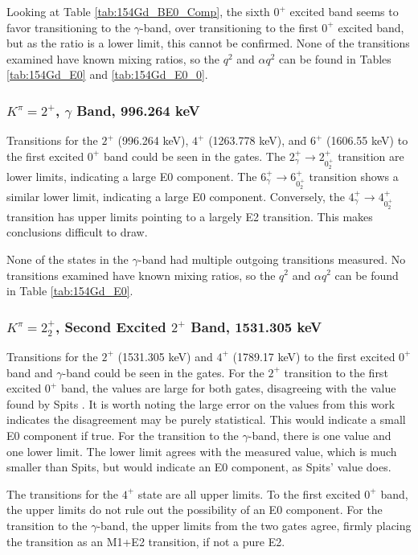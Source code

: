 Looking at Table \ref{tab:154Gd_BE0_Comp}, the sixth $0^+$ excited band seems to favor transitioning to the $\gamma$-band, over transitioning to the first $0^+$ excited band, but as the ratio is a lower limit, this cannot be confirmed. None of the transitions examined have known mixing ratios, so the $q^2$ and $\alpha q^2$ can be found in Tables \ref{tab:154Gd_E0} and \ref{tab:154Gd_E0_0}. 

\subsubsection{$K^{\pi}=2^+$, $\gamma$ Band, 996.264 keV}

Transitions for the $2^+$ (996.264 keV), $4^+$ (1263.778 keV), and $6^+$ (1606.55 keV) to the first excited $0^+$ band could be seen in the gates. The $2^+_{\gamma}\rightarrow 2^+_{0^+_2}$ transition are lower limits, indicating a large E0 component. The $6^+_{\gamma}\rightarrow 6^+_{0^+_2}$ transition shows a similar lower limit, indicating a large E0 component. Conversely, the $4^+_{\gamma}\rightarrow 4^+_{0^+_2}$ transition has upper limits pointing to a largely E2 transition. This makes conclusions difficult to draw.

None of the states in the $\gamma$-band had multiple outgoing transitions measured.  No transitions examined have known mixing ratios, so the $q^2$ and $\alpha q^2$ can be found in Table \ref{tab:154Gd_E0}. 

\subsubsection{$K^{\pi}=2^+_2$, Second Excited $2^+$ Band, 1531.305 keV}

Transitions for the $2^+$ (1531.305 keV) and $4^+$ (1789.17 keV) to the first excited $0^+$ band and $\gamma$-band could be seen in the gates. For the $2^+$ transition to the first excited $0^+$ band, the values are large for both gates, disagreeing with the value found by Spits \citep{spits96:_154gd}. It is worth noting the large error on the values from this work indicates the disagreement may be purely statistical. This would indicate a small E0 component if true. For the transition to the $\gamma$-band, there is one value and one lower limit. The lower limit agrees with the measured value, which is much smaller than Spits, but would indicate an E0 component, as Spits' value does.

The transitions for the $4^+$ state are all upper limits. To the first excited $0^+$ band, the upper limits do not rule out the possibility of an E0 component. For the transition to the $\gamma$-band, the upper limits from the two gates agree, firmly placing the transition as an M1+E2 transition, if not a pure E2.

